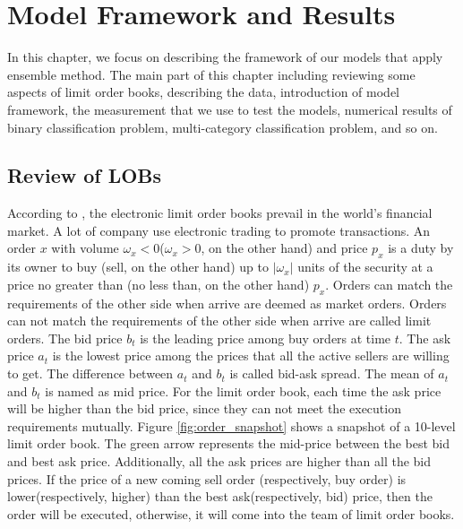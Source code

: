 \chapter{Model Framework and Results}\label{ch:ensemble} 
In this chapter,   we focus on describing the framework of our models that apply ensemble method. The main part of this chapter including reviewing some aspects of limit order books, describing the data, introduction of model framework, the measurement that we use to test the models, numerical results of binary classification problem, multi-category classification problem, and so on.   
\section{Review of LOBs}
According to \cite{rocsu2009dynamic},  the electronic limit order books prevail in the world's financial market. A lot of company use electronic trading to promote transactions. An order $x$ with volume $\omega_x<0$($\omega_x>0$,  on the other hand) and price $p_x$ is a duty by its owner to buy (sell,  on the other hand) up to $|\omega_x|$ units of the security at a price no greater than (no less than,   on the other hand) $p_x$. Orders can match the requirements of the other side when arrive are deemed as market orders. Orders can not match the requirements of the other side when arrive are called  limit orders. The bid price $b_t$ is the leading price among buy orders at time $t$. The ask price $a_t$ is the lowest price among the prices that all the active sellers are willing to get. The difference between $a_t$ and $b_t$ is called bid-ask spread. The mean of $a_t$ and $b_t$ is named as mid price. For the limit order book,   each time the ask price will be higher than the bid price,   since they can not meet the execution requirements mutually. Figure \ref{fig:order_snapshot} shows a snapshot of a 10-level limit order book. The green arrow represents the mid-price between the best bid and best ask price. Additionally, all the ask prices are higher than all the bid prices. If the price of a new coming sell order (respectively,   buy order) is lower(respectively,   higher) than the best ask(respectively,   bid) price,   then the order will be executed,   otherwise,   it will come into the team of limit order books.

